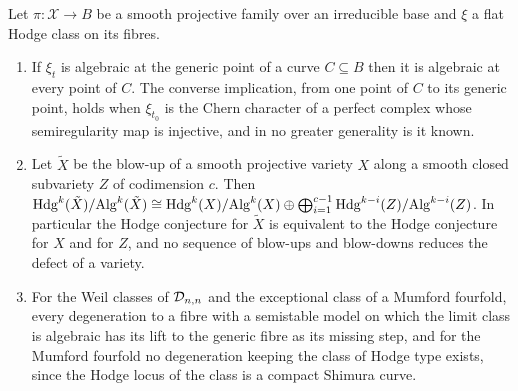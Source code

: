 \begin{proposition}\label{prop:bypass}
Let $\pi:\mathcal{X}\to B$ be a smooth projective family over an irreducible base and $\xi$ a flat Hodge class on its fibres.
\begin{enumerate}[label=\textup{(\roman*)},leftmargin=2.4em,itemsep=2pt]
\item If $\xi_{t}$ is algebraic at the generic point of a curve $C\subseteq B$ then it is algebraic at every point of $C$. The converse implication, from one point of $C$ to its generic point, holds when $\xi_{t_{0}}$ is the Chern character of a perfect complex whose semiregularity map is injective, and in no greater generality is it known.
\item Let $\tilde X$ be the blow-up of a smooth projective variety $X$ along a smooth closed subvariety $Z$ of codimension $c$. Then $\mathrm{Hdg}^{k}(\tilde X)/\mathrm{Alg}^{k}(\tilde X)\cong\mathrm{Hdg}^{k}(X)/\mathrm{Alg}^{k}(X)\oplus\bigoplus_{i=1}^{c-1}\mathrm{Hdg}^{k-i}(Z)/\mathrm{Alg}^{k-i}(Z)$. In particular the Hodge conjecture for $\tilde X$ is equivalent to the Hodge conjecture for $X$ and for $Z$, and no sequence of blow-ups and blow-downs reduces the defect of a variety.
\item For the Weil classes of $\mathcal{D}_{n,n}$ and the exceptional class of a Mumford fourfold, every degeneration to a fibre with a semistable model on which the limit class is algebraic has its lift to the generic fibre as its missing step, and for the Mumford fourfold no degeneration keeping the class of Hodge type exists, since the Hodge locus of the class is a compact Shimura curve.
\end{enumerate}
\end{proposition}

